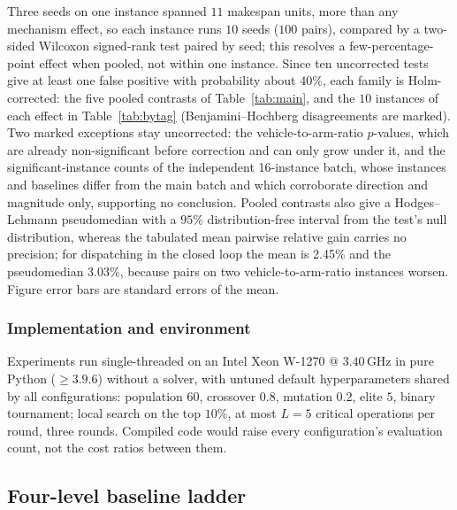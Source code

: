 \documentclass[preprint,review,12pt,authoryear]{elsarticle}
\newcommand{\NCases}{10}
\newcommand{\NSeeds}{10}
\newcommand{\NPairs}{100}
\newcommand{\GainProbeLoop}{2.45\%}      %
\newcommand{\HLProbeLoop}{3.03\%}
\newcommand{\MatrixCells}{16}
\begin{document}
Three seeds on one instance spanned $11$ makespan units, more than any mechanism effect, so each instance runs $\NSeeds$ seeds ($\NPairs$ pairs), compared by a two-sided Wilcoxon signed-rank test paired by seed; this resolves a few-percentage-point effect when pooled, not within one instance.
Since ten uncorrected tests give at least one false positive with probability about $40\%$, each family is Holm-corrected: the five pooled contrasts of Table~\ref{tab:main}, and the $\NCases$ instances of each effect in Table~\ref{tab:bytag} (Benjamini--Hochberg disagreements are marked).
Two marked exceptions stay uncorrected: the vehicle-to-arm-ratio $p$-values, which are already non-significant before correction and can only grow under it, and the significant-instance counts of the independent \MatrixCells{}-instance batch, whose instances and baselines differ from the main batch and which corroborate direction and magnitude only, supporting no conclusion.
Pooled contrasts also give a Hodges--Lehmann pseudomedian with a $95\%$ distribution-free interval from the test's null distribution, whereas the tabulated mean pairwise relative gain carries no precision; for dispatching in the closed loop the mean is \GainProbeLoop{} and the pseudomedian \HLProbeLoop{}, because pairs on two vehicle-to-arm-ratio instances worsen.
Figure error bars are standard errors of the mean.

\subsubsection{Implementation and environment}
\label{sec:impl}
Experiments run single-threaded on an Intel Xeon W-1270 @ $3.40$\,GHz in pure Python ($\ge 3.9.6$) without a solver, with untuned default hyperparameters shared by all configurations: population $60$, crossover $0.8$, mutation $0.2$, elite $5$, binary tournament; local search on the top $10\%$, at most $L=5$ critical operations per round, three rounds.
Compiled code would raise every configuration's evaluation count, not the cost ratios between them.

\subsection{Four-level baseline ladder}
\label{sec:arms}
\end{document}
